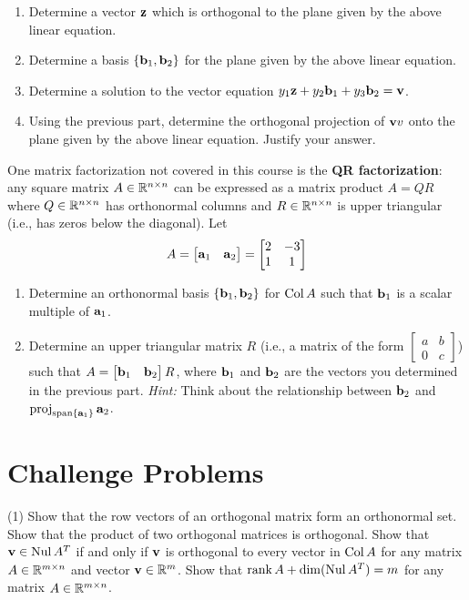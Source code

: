 \begin{tasks}[resume, style=enumerate]
  \begin{enumerate}[label=(\alph*)]
  \item
    Determine a vector $\mathbf z$ which is orthogonal to the plane given by
    the above linear equation.
  \item
    Determine a basis $\{\mathbf b_1, \mathbf b_2\}$ for the plane given by the
    above linear equation.
  \item
    Determine a solution to the vector equation $y_1\mathbf z + y_2\mathbf b_1 +
    y_3\mathbf b_2 = \mathbf v$.
  \item
    Using the previous part, determine the orthogonal projection of
    $\mathbf v v$ onto the plane given by the above linear equation.
    Justify your answer.
  \end{enumerate}
\task
  One matrix factorization not covered in this course is the
  \textbf{QR factorization}: any square matrix $A \in \mathbb R^{n \times n}$
  can be expressed as a matrix product $A = QR$ where $Q \in \mathbb R^{n
  \times n}$ has orthonormal columns and $R \in \mathbb R^{n \times n}$ is
  upper triangular (i.e., has zeros below the diagonal).  Let
  \begin{displaymath}
    A = \begin{bmatrix} \mathbf a_1 & \mathbf a_2 \end{bmatrix}
    =
    \begin{bmatrix} 2 & -3 \\ 1 & 1 \end{bmatrix}
  \end{displaymath}
  \begin{enumerate}[label=(\alph*)]
  \item
    Determine an orthonormal basis $\{\mathbf b_1, \mathbf b_2\}$ for $\operatorname{\mathrm{Col}} A$
    such that $\mathbf b_1$ is a scalar multiple of $\mathbf a_1$.
  \item
    Determine an upper triangular matrix $R$ (i.e., a matrix of the
    form $\begin{bmatrix} a & b \\ 0 & c \end{bmatrix}$) such that $A =
    \begin{bmatrix} \mathbf b_1 & \mathbf b_2 \end{bmatrix} R$, where $\mathbf b_1$ and
    $\mathbf b_2$ are the vectors you determined in the previous part.
    \textit{Hint:} Think about the relationship between $\mathbf b_2$ and
    $\operatorname{\mathrm{proj}}_{\operatorname{\mathrm{span}}\{\mathbf a_1\}} \mathbf a_2$.
  \end{enumerate}
\end{tasks}

\section{Challenge Problems}

\begin{tasks}[resume, style=enumerate](1)
\task
  Show that the row vectors of an orthogonal matrix form an
  orthonormal set.
\task
  Show that the product of two orthogonal matrices is orthogonal.
\task
  Show that $\mathbf v \in \operatorname{\mathrm{Nul}} A^T$ if and only if $\mathbf v$ is orthogonal to
  every vector in $\operatorname{\mathrm{Col}} A$ for any matrix $A \in \mathbb R^{m \times n}$ and
  vector $\mathbf v \in \mathbb R^m$.
\task
  Show that $\operatorname{\mathrm{rank}} A + \dim(\operatorname{\mathrm{Nul}} A^T) = m$ for any matrix $A \in \mathbb R^{m
    \times n}$.
\end{tasks}
